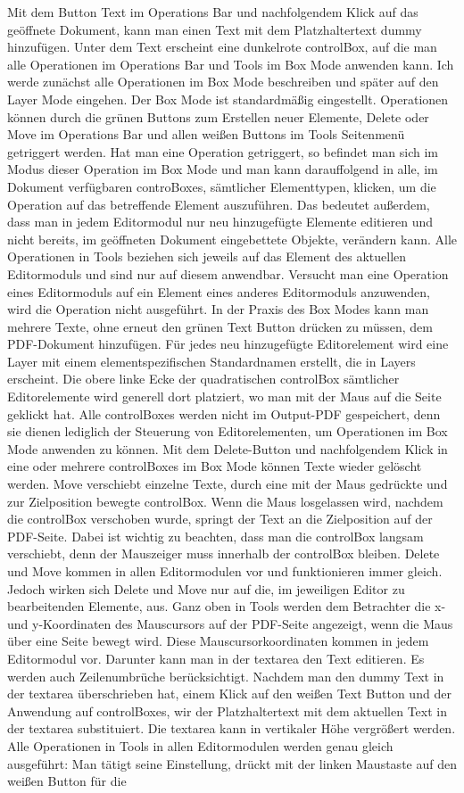 Mit dem Button Text im Operations Bar und nachfolgendem Klick auf das geöffnete Dokument, kann man einen Text mit dem Platzhaltertext dummy hinzufügen. Unter dem Text erscheint eine dunkelrote controlBox, auf die man alle Operationen im Operations Bar und Tools im Box Mode anwenden kann. Ich werde zunächst alle Operationen im Box Mode beschreiben und später auf den Layer Mode eingehen. Der Box Mode ist standardmäßig eingestellt. Operationen können durch die grünen Buttons zum Erstellen neuer Elemente, Delete oder Move im Operations Bar und allen weißen Buttons im Tools Seitenmenü getriggert werden. Hat man eine Operation getriggert, so befindet man sich im Modus dieser Operation im Box Mode und man kann darauffolgend in alle, im Dokument verfügbaren controBoxes, sämtlicher Elementtypen, klicken, um die Operation auf das betreffende Element auszuführen. Das bedeutet außerdem, dass man in jedem Editormodul nur neu hinzugefügte Elemente editieren und nicht bereits, im geöffneten Dokument eingebettete Objekte, verändern kann. Alle Operationen in Tools beziehen sich jeweils auf das Element des aktuellen Editormoduls und sind nur auf diesem anwendbar. Versucht man eine Operation eines Editormoduls auf ein Element eines anderes Editormoduls anzuwenden, wird die Operation nicht ausgeführt. In der Praxis des Box Modes kann man mehrere Texte, ohne erneut den grünen Text Button drücken zu müssen, dem PDF-Dokument hinzufügen. Für jedes neu hinzugefügte Editorelement wird eine Layer mit einem elementspezifischen Standardnamen erstellt, die in Layers erscheint. Die obere linke Ecke der quadratischen controlBox sämtlicher Editorelemente wird generell dort platziert, wo man mit der Maus auf die Seite geklickt hat. Alle controlBoxes werden nicht im  Output-PDF gespeichert, denn sie dienen lediglich der Steuerung von Editorelementen, um Operationen im Box Mode anwenden zu können. Mit dem Delete-Button und nachfolgendem Klick in eine oder mehrere controlBoxes im Box Mode können Texte wieder gelöscht werden. Move verschiebt einzelne Texte, durch eine mit der Maus gedrückte und zur Zielposition bewegte controlBox. Wenn die Maus losgelassen wird, nachdem die controlBox verschoben wurde, springt der Text an die Zielposition auf der PDF-Seite. Dabei ist wichtig zu beachten, dass man die controlBox langsam verschiebt, denn der Mauszeiger muss innerhalb der controlBox bleiben. Delete und Move kommen in allen Editormodulen vor und funktionieren immer gleich. Jedoch wirken sich Delete und Move nur auf die, im jeweiligen Editor zu bearbeitenden Elemente, aus. Ganz oben in Tools werden dem Betrachter die x- und y-Koordinaten des Mauscursors auf der PDF-Seite angezeigt, wenn die Maus über eine Seite bewegt wird. Diese Mauscursorkoordinaten kommen in jedem Editormodul vor. Darunter kann man in der textarea den Text editieren. Es werden auch Zeilenumbrüche berücksichtigt. Nachdem man den dummy Text in der textarea überschrieben hat, einem Klick auf den weißen Text Button und der Anwendung auf controlBoxes, wir der Platzhaltertext mit dem aktuellen Text in der textarea substituiert. Die textarea kann in vertikaler Höhe vergrößert werden. Alle Operationen in Tools in allen Editormodulen werden genau gleich ausgeführt: Man tätigt seine Einstellung, drückt mit der linken Maustaste auf den weißen Button für die 